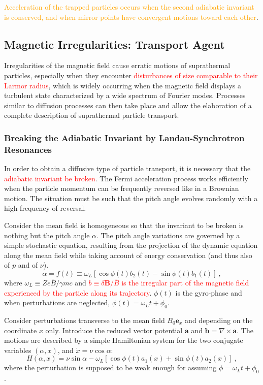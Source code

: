 \documentclass[12pt,a4paper]{article}
\renewcommand{\vec}[1]{\boldsymbol{#1}}
\begin{document}
\textcolor{orange}{Acceleration of the trapped particles occurs when the second adiabatic invariant is conserved, and when mirror points have convergent motions toward each other}.

\subsection{Magnetic Irregularities: Transport Agent}
Irregularities of the magnetic field cause erratic motions of suprathermal particles, especially when they encounter \textcolor{red}{disturbances of size comparable to their Larmor radius}, which is widely occurring when the magnetic field displays a turbulent state characterized by a wide spectrum of Fourier modes. Processes similar to diffusion processes can then take place and allow the elaboration of a complete description of suprathermal particle transport.

\subsubsection{Breaking the Adiabatic Invariant by Landau-Synchrotron Resonances}
In order to obtain a diffusive type of particle transport, it is necessary that the \textcolor{red}{adiabatic invariant be broken}. The Fermi acceleration process works efficiently when the particle momentum can be frequently reversed like in a Brownian motion. The situation must be such that the pitch angle evolves randomly with a high frequency of reversal.

Consider the mean field is homogeneous so that the invariant to be broken is nothing but the pitch angle $\alpha$. 
The pitch angle variations are governed by a simple stochastic equation, resulting from the projection of the dynamic equation along the mean field while taking account of energy conservation (and thus also of $p$ and of $\nu$).
\begin{equation}
\dot{\alpha} = f(t) \equiv \omega_L [\cos \phi(t) b_2(t) -\sin \phi(t) b_1(t)] ~,
\end{equation}
where $\omega_L \equiv Ze\bar{B}/\gamma mc$ and \textcolor{red}{$b \equiv \delta \vec{B}/\bar{B}$ is the irregular part of the magnetic field experienced by the particle along its trajectory}. $\phi(t)$ is the gyro-phase and when perturbations are neglected, $\phi(t) = \omega_L t +\phi_0$.

Consider perturbations transverse to the mean field $B_0 \vec{e}_x$ and depending on the coordinate $x$ only. Introduce the reduced vector potential $\vec{a}$ and $\vec{b} = \nabla \times \vec{a}$. The motions are described by a simple Hamiltonian system for the two conjugate variables $(\alpha, x)$, and $\dot{x} = \nu \cos \alpha$:
\begin{equation}
H(\alpha, x) = \nu \sin \alpha -\omega_L [\cos \phi(t) a_1(x) +\sin \phi(t) a_2(x) ] ~,
\end{equation}
where the perturbation is supposed to be weak enough for assuming $\phi = \omega_L t + \phi_0$.
\end{document}
